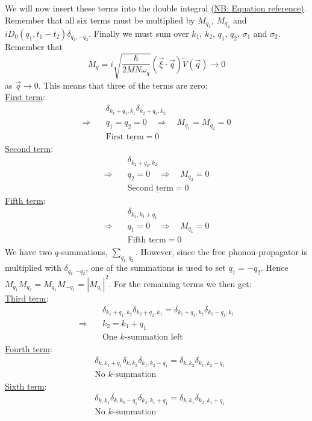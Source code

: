 We will now insert these terms into the double integral \underline{(NB: Equation reference)}. Remember that all six terms must be multiplied by $M_{q_1}$, $M_{q_2}$ and $iD_0(q_1,t_1-t_2)\delta_{q_1,-q_2}$. Finally we must sum over $k_1$, $k_2$, $q_1$, $q_2$, $\sigma_1$ and $\sigma_2$. Remember that
\[M_q = i\sqrt{\frac{\hbar}{2MN\omega_q}}\left(\vec{\xi}\cdot\vec{q}\right)\tilde{V}(\vec{q}) \rightarrow 0
\]
as $\vec{q}\rightarrow 0$. This means that three of the terms are zero:\\
\underline{First term}:
\[\begin{aligned}
    &\delta_{k_1+q_1,k_1} \delta_{k_2+q_2,k_2}\\
    \Rightarrow\quad &q_1 = q_2 = 0 \quad\Rightarrow \quad M_{q_1} = M_{q_2} = 0\\
    &\underline{\text{First term} = 0}
\end{aligned}\]
\underline{Second term}:
\[\begin{aligned}
    &\delta_{k_2+q_2,k_2}\\
    \Rightarrow\quad &q_2 = 0 \quad\Rightarrow \quad M_{q_2} = 0\\
    &\underline{\text{Second term} = 0}
\end{aligned}\]
\underline{Fifth term}:
\[\begin{aligned}
    &\delta_{k_1,k_1+q_1}\\
    \Rightarrow\quad &q_1 = 0 \quad\Rightarrow \quad M_{q_1} = 0\\
    &\underline{\text{Fifth term} = 0}
\end{aligned}\]
We have two $q$-summations, $\sum\limits_{q_1,q_2}$. However, since the free phonon-propagator is multiplied with $\delta_{q_1,-q_2}$, one of the summations is used to set $q_1 = -q_2$. Hence $M_{q_1}M_{q_2} = M_{q_1}M_{-q_1} = \left|M_{q_1}\right|^2$. For the remaining terms we then get:\\
\underline{Third term}:
\[\begin{aligned}
    &\delta_{k_1+q_1,k_2} \delta_{k_2+q_2,k_1} = \delta_{k_1+q_1,k_2} \delta_{k_2-q_1,k_1}\\
    \Rightarrow\quad &k_2 = k_1+q_1\\
    &\underline{\text{One $k$-summation left}}
\end{aligned}\]
\underline{Fourth term}:
\[\begin{aligned}
    &\delta_{k,k_1+q_1}\delta_{k,k_2} \delta_{k_1,k_2-q_1} = \delta_{k,k_2} \delta_{k_1,k_2-q_1}\\
    &\underline{\text{No $k$-summation}}
\end{aligned}\]
\underline{Sixth term}:
\[\begin{aligned}
    &\delta_{k,k_1}\delta_{k,k_2-q_1} \delta_{k_2,k_1+q_1} = \delta_{k,k_1} \delta_{k_2,k_1+q_1}\\
    &\underline{\text{No $k$-summation}}
\end{aligned}\]

